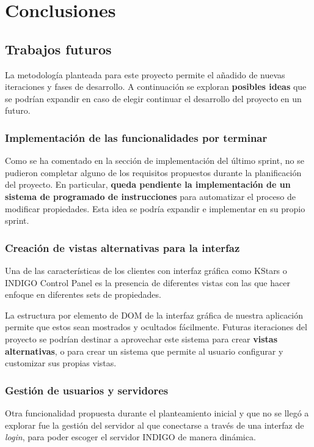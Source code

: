 \chapter{Conclusiones}

\section{Trabajos futuros}

La metodología planteada para este proyecto permite el añadido de nuevas iteraciones y fases de desarrollo. A continuación se exploran \textbf{posibles ideas} que se podrían expandir en caso de elegir continuar el desarrollo del proyecto en un futuro.

\subsection{Implementación de las funcionalidades por terminar}

Como se ha comentado en la sección de implementación del último sprint, no se pudieron completar alguno de los requisitos propuestos durante la planificación del proyecto. En particular, \textbf{queda pendiente la implementación de un sistema de programado de instrucciones} para automatizar el proceso de modificar propiedades. Esta idea se podría expandir e implementar en su propio sprint.

\subsection{Creación de vistas alternativas para la interfaz}

Una de las características de los clientes con interfaz gráfica como KStars o INDIGO Control Panel es la presencia de diferentes vistas con las que hacer enfoque en diferentes sets de propiedades.

La estructura por elemento de DOM de la interfaz gráfica de nuestra aplicación permite que estos sean mostrados y ocultados fácilmente. Futuras iteraciones del proyecto se podrían destinar a aprovechar este sistema para crear \textbf{vistas alternativas}, o para crear un sistema que permite al usuario configurar y customizar sus propias vistas.

\subsection{Gestión de usuarios y servidores}

Otra funcionalidad propuesta durante el planteamiento inicial y que no se llegó a explorar fue la gestión del servidor al que conectarse a través de una interfaz de \textit{login}, para poder escoger el servidor INDIGO de manera dinámica. 


